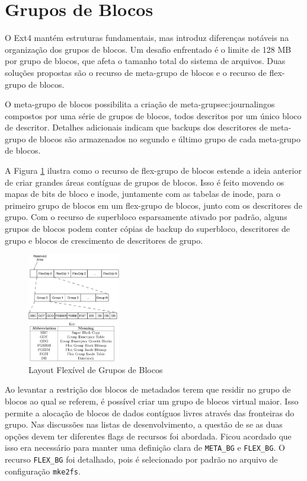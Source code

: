\documentclass[
	12pt,				%
	openright,			%
	oneside,			%
	a4paper,			%
	chapter=TITLE,		%
	english,			%
	french,				%
	spanish,			%
	brazil				%
	]{abntex2}
\theoremstyle{definition}
\begin{document}
\section{Grupos de Blocos}
O Ext4 mantém estruturas fundamentais, mas introduz diferenças notáveis na organização dos grupos 
de blocos. Um desafio enfrentado é o limite de 128 MB por grupo de blocos, que afeta o tamanho total 
do sistema de arquivos. Duas soluções propostas são o recurso de meta-grupo de blocos e o recurso de 
flex-grupo de blocos.

O meta-grupo de blocos possibilita a criação de meta-grup{sec:journaling}os compostos por uma série de grupos de 
blocos, todos descritos por um único bloco de descritor. Detalhes adicionais indicam que backups 
dos descritores de meta-grupo de blocos são armazenados no segundo e último grupo de cada meta-grupo de blocos.

A Figura \ref{fig:9} ilustra como o recurso de flex-grupo de blocos estende a ideia anterior 
de criar grandes áreas contíguas de grupos de blocos. Isso é feito movendo os mapas de bits de bloco e 
inode, juntamente com as tabelas de inode, para o primeiro grupo de blocos em um flex-grupo de blocos, 
junto com os descritores de grupo. Com o recurso de superbloco esparsamente ativado por padrão, alguns
grupos de blocos podem conter cópias de backup do superbloco, descritores de grupo e blocos de 
crescimento de descritores de grupo.

\begin{figure}[H]
	\centering
	\includegraphics[width=0.36\textwidth]{fig9.jpg}
	\caption{Layout Flexível de Grupos de Blocos}
	\label{fig:9}
\end{figure}

Ao levantar a restrição dos blocos de metadados terem que residir no grupo de blocos ao qual se 
referem, é possível criar um grupo de blocos virtual maior. Isso permite a alocação de blocos de
dados contíguos livres através das fronteiras do grupo. Nas discussões nas listas de desenvolvimento, 
a questão de se as duas opções devem ter diferentes flags de recursos foi abordada. Ficou acordado 
que isso era necessário para manter uma definição clara de \texttt{META\_BG} e \texttt{FLEX\_BG}. 
O recurso \texttt{FLEX\_BG} foi detalhado, pois é selecionado por padrão no arquivo de configuração \texttt{mke2fs}.
\end{document}
